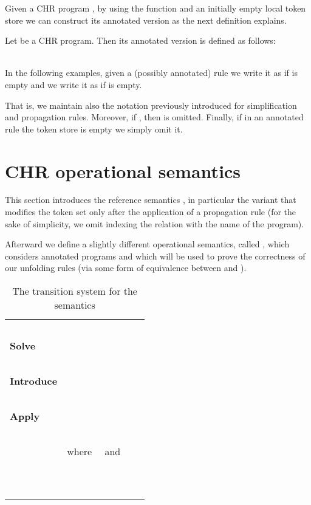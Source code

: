 \documentclass[final]{acmtrans2e}
\begin{document}
Given a CHR program , by using the function  and
an initially empty local token store we can construct its annotated
version as the next definition explains.


\begin{definition}
Let  be a CHR program. Then its annotated version is defined as follows:

\end{definition}


 \\
In the following examples, given a
(possibly annotated) rule
   we write it as
 if  is empty and
we write it as
 if  is empty.

That is, we maintain also the notation previously introduced for
simplification and propagation rules. Moreover, if , then  is omitted.
Finally,  if in an annotated rule the token store is empty we
simply  omit it.


\section{CHR operational semantics}\label{sec:semantics}

This section introduces the reference semantics 
\cite{DSGH04}, in particular the variant that modifies the token
set only after the application of a propagation rule (for the sake
of simplicity, we omit indexing the relation with the name of the
program).


Afterward we define a slightly different operational  semantics,
called , which considers annotated programs and which
will be used to prove the correctness of our unfolding rules (via some form of
equivalence between   and ).


\begin{table*}[tbp]
\caption{The transition  system  for the  semantics}
\centering
\label{omega-t}


\begin{tabular}{lll}
\hline\noalign{\smallskip}
&\mbox{   }&\mbox{   }
\\
\mbox{\bf Solve} &  



&\mbox{ }
\\
&\mbox{   }&\mbox{   }
\\

\mbox{\bf Introduce}&  &\mbox{ }
\\
&\mbox{   }&\mbox{   }
\\

\mbox{\bf Apply}& &\mbox{ }
\\
&\mbox{   }&\mbox{   }
\\
&\mbox{where }
\mbox{ and }\\
&&\mbox{
}
\\
&\mbox{   }&\mbox{   }
\\
\noalign{\smallskip}\hline
\end{tabular}
\end{table*}
\end{document}
